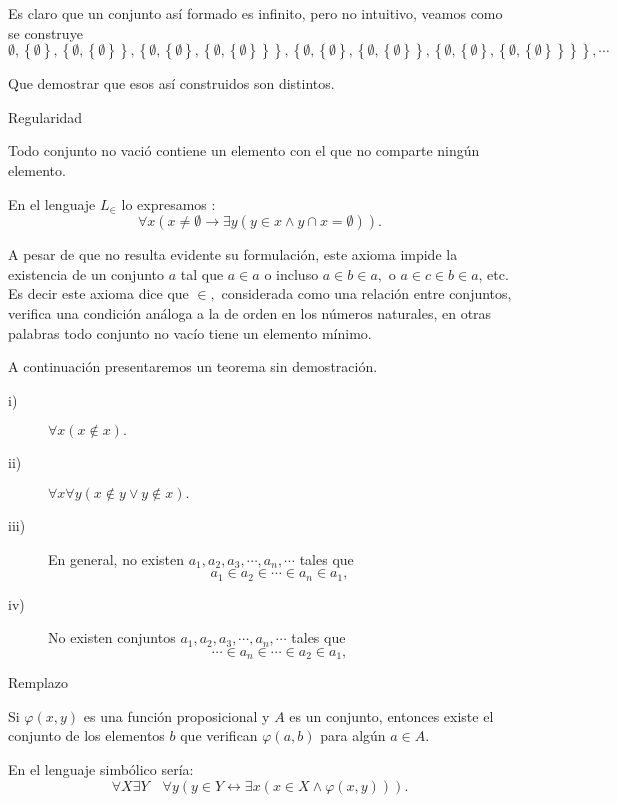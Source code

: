 Es claro que un conjunto así formado es infinito, pero no intuitivo,
veamos como se construye
\[
\emptyset,\left\{ \emptyset\right\} ,\left\{ \emptyset,\left\{ \emptyset\right\} \right\} ,\left\{ \emptyset,\left\{ \emptyset\right\} ,\left\{ \emptyset,\left\{ \emptyset\right\} \right\} \right\} ,\left\{ \emptyset,\left\{ \emptyset\right\} ,\left\{ \emptyset,\left\{ \emptyset\right\} \right\} ,\left\{ \emptyset,\left\{ \emptyset\right\} ,\left\{ \emptyset,\left\{ \emptyset\right\} \right\} \right\} \right\} ,\cdots
\]

Que demostrar que esos así construidos son distintos.

\begin{axioma}{Regularidad}{}

Todo conjunto no vació contiene un elemento con el que no comparte
ningún elemento.

En el lenguaje $L_{\in}$ lo expresamos :
\[
\forall x\left(x\neq\emptyset\rightarrow\exists y\left(y\in x\wedge y\cap x=\emptyset\right)\right).
\]

\end{axioma}

A pesar de que no resulta evidente su formulación, este axioma impide
la existencia de un conjunto $a$ tal que $a\in a$ o incluso $a\in b\in a,$
o $a\in c\in b\in a$, etc. Es decir este axioma dice que $\in,$
considerada como una relación entre conjuntos, verifica una condición
análoga a la de orden en los números naturales, en otras palabras
todo conjunto no vacío tiene un elemento mínimo.

A continuación presentaremos un teorema sin demostración.

\begin{teo}{}{}
\begin{description}
\item [{i)}] $\forall x\left(x\notin x\right).$
\item [{ii)}] $\forall x\forall y\left(x\notin y\vee y\notin x\right).$
\item [{iii)}] En general, no existen $a_{1},a_{2},a_{3},\cdots,a_{n},\cdots$
tales que
\[
a_{1}\in a_{2}\in\cdots\in a_{n}\in a_{1},
\]
\item [{iv)}] No existen conjuntos $a_{1},a_{2},a_{3},\cdots,a_{n},\cdots$
tales que
\[
\cdots\in a_{n}\in\cdots\in a_{2}\in a_{1},
\]
\end{description}
\end{teo}

\begin{axioma}{Remplazo}{}

Si $\varphi\left(x,y\right)$ es una función proposicional y $A$
es un conjunto, entonces existe el conjunto de los elementos $b$
que verifican $\varphi\left(a,b\right)$ para algún $a\in A.$ 

En el lenguaje simbólico sería:
\[
\forall X\exists Y\quad\forall y\left(y\in Y\leftrightarrow\exists x\left(x\in X\wedge\varphi\left(x,y\right)\right)\right).
\]

\end{axioma}

